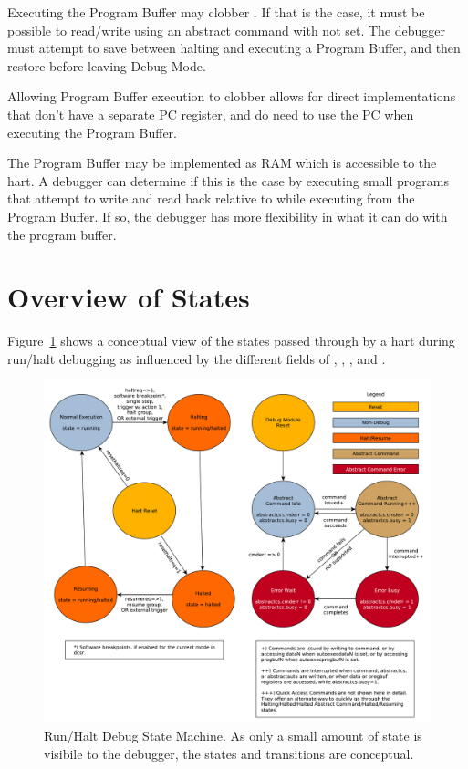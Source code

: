 Executing the Program Buffer may clobber \Rdpc. If that is the case, it must be
possible to read/write \Rdpc using an abstract command with \Fpostexec not set.
The debugger must attempt to save \Rdpc between halting and
executing a Program Buffer, and then restore \Rdpc before leaving Debug Mode.

\begin{commentary}
    Allowing Program Buffer execution to clobber \Rdpc allows for direct
    implementations that don't have a separate PC register, and do need to use
    the PC when executing the Program Buffer.
\end{commentary}

The Program Buffer may be implemented as RAM which is accessible to the
hart. A debugger can determine if this is the case by executing small
programs that attempt to write and read back relative to \Rpc while executing
from the Program Buffer.
If so, the debugger has more flexibility in what it can do with the program buffer.

\section{Overview of States}

Figure~\ref{fig:abstract_sm} shows a conceptual view of the states
passed through by a hart during run/halt debugging as influenced
by the different fields of \Rdmcontrol, \Rabstractcs, \Rabstractauto, and
\Rcommand.

\begin{figure}
   \centering
   \includegraphics[width=\textwidth]{fig/abstract_commands.pdf}
   \caption[Run/Halt Debug State Machine]{Run/Halt Debug State Machine.
     As only a small amount of state is visibile to the debugger,
     the states and transitions are conceptual.}
   \label{fig:abstract_sm}
\end{figure}

